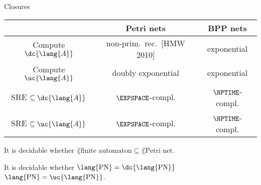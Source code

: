 \documentclass[../talk.tex]{subfiles}
\begin{document}
\begin{frame}{Closures}
    \begin{overlayarea}{\slidewidth}{\slideheight}
        \renewcommand{\arraystretch}{1.5}
        \begin{tabular}{c|cc}
            & Petri nets
            & BPP nets
            \\
            \hline
            Compute $\dc{\lang{A}}$
            &
            non-prim.~rec.~[HMW 2010]
            &
            \alert{exponential}
            \\
            Compute $\uc{\lang{A}}$
            &
            \alert{doubly exponential}
            &
            \alert{exponential}
            \\
                SRE $\subseteq \dc{\lang{A}}$
                &
                \alert{$\EXPSPACE$-compl.}
                &
                \alert{$\NPTIME$-compl.}
                \\
                SRE $\subseteq \uc{\lang{A}}$
                &
                \alert{$\EXPSPACE$-compl.}
                &
                \alert{$\NPTIME$-compl.}
        \end{tabular}

        \vspace*{1em}

            \begin{theorem}
                It is \alert{decidable} whether $\lang{\text{finite automaton}} \subseteq \lang{\text{Petri net}}$.
            \end{theorem}

            \begin{theorem}
                It is \alert{decidable} whether $\lang{\text{PN}} = \dc{\lang{\text{PN}}}$ \resp $\lang{\text{PN}} = \uc{\lang{\text{PN}}}$.
            \end{theorem}

    \end{overlayarea}
\end{frame}
\end{document}
